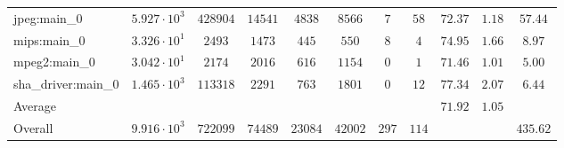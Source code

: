 \begin{tabular}{|l|c|c|c|c|c|c|c|c|c|c|}
jpeg:main\_0            & $ 5.927 \cdot 10^{3} $ & $ 428904 $ & $ 14541 $ & $ 4838  $ & $ 8566  $ & $ 7   $ & $ 58  $ & $ 72.37       $ & $ 1.18    $ & $ 57.44   $ \\
mips:main\_0            & $ 3.326 \cdot 10^{1} $ & $ 2493   $ & $ 1473  $ & $ 445   $ & $ 550   $ & $ 8   $ & $ 4   $ & $ 74.95       $ & $ 1.66    $ & $ 8.97    $ \\
mpeg2:main\_0           & $ 3.042 \cdot 10^{1} $ & $ 2174   $ & $ 2016  $ & $ 616   $ & $ 1154  $ & $ 0   $ & $ 1   $ & $ 71.46       $ & $ 1.01    $ & $ 5.00    $ \\
sha\_driver:main\_0     & $ 1.465 \cdot 10^{3} $ & $ 113318 $ & $ 2291  $ & $ 763   $ & $ 1801  $ & $ 0   $ & $ 12  $ & $ 77.34       $ & $ 2.07    $ & $ 6.44    $ \\
\hline
Average                 & $                    $ & $        $ & $       $ & $       $ & $       $ & $     $ & $     $ & $ 71.92       $ & $ 1.05    $ & $         $ \\
\hline
Overall                 & $ 9.916 \cdot 10^{3} $ & $ 722099 $ & $ 74489 $ & $ 23084 $ & $ 42002 $ & $ 297 $ & $ 114 $ & $             $ & $         $ & $ 435.62  $ \\
\hline
\end{tabular}
